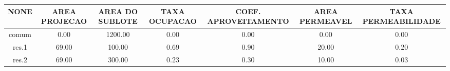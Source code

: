 \documentclass[11pt]{article}
\begin{document}
\begin{tabular}{ccccccc}
\hline
NONE & AREA PROJECAO & AREA DO SUBLOTE & TAXA OCUPACAO & COEF. APROVEITAMENTO & AREA PERMEAVEL & TAXA PERMEABILIDADE\\
\hline
comum & 0.00 & 1200.00 & 0.00 & 0.00 & 0.00 & 0.00 \\
res.1 & 69.00 & 100.00 & 0.69 & 0.90 & 20.00 & 0.20 \\
res.2 & 69.00 & 300.00 & 0.23 & 0.30 & 10.00 & 0.03 \\
\hline
\end{tabular}
\end{document}
